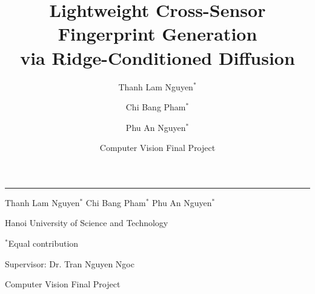 \documentclass[aspectratio=169,10pt]{beamer}
\title[Lightweight Cross-Sensor Fingerprint Generation]{Lightweight Cross-Sensor Fingerprint Generation\\via Ridge-Conditioned Diffusion}
\author[Nguyen, Pham, Nguyen]{Thanh Lam Nguyen\texorpdfstring{$^{*}$}{*}
  \and Chi Bang Pham\texorpdfstring{$^{*}$}{*}
  \and Phu An Nguyen\texorpdfstring{$^{*}$}{*}}
\institute{Hanoi University of Science and Technology\\
{\small $^{*}$Equal contribution \quad Supervisor: Dr. Tran Nguyen Ngoc}}
\date{Computer Vision Final Project}
\begin{document}
\begin{frame}[plain]
  \centering
  \vspace{1.0cm}
  {\inserttitle\par}
  \vspace{0.35cm}
  {\color{Accent}\rule{0.62\linewidth}{0.7pt}\par}
  \vspace{0.9cm}
  {\normalsize Thanh Lam Nguyen\texorpdfstring{$^{*}$}{*}
  \hspace{1.6em} Chi Bang Pham\texorpdfstring{$^{*}$}{*}
  \hspace{1.6em} Phu An Nguyen\texorpdfstring{$^{*}$}{*}\par}
  \vspace{0.45cm}
  {\small Hanoi University of Science and Technology\par}
  \vspace{0.18cm}
  {\small \texorpdfstring{$^{*}$}{*}Equal contribution\par}
  \vspace{0.18cm}
  {\small Supervisor: Dr. Tran Nguyen Ngoc\par}
  \vfill
  {\small Computer Vision Final Project\par}
  \vspace{0.5cm}
\end{frame}
\end{document}
